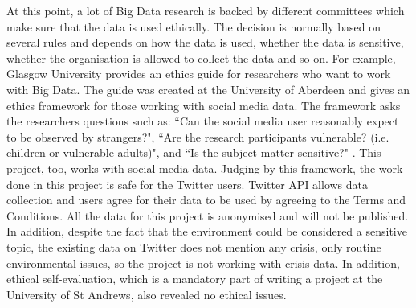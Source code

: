 At this point, a lot of Big Data research is backed by different committees which make sure that the data is used ethically. The decision is normally based on several rules and depends on how the data is used, whether the data is sensitive, whether the organisation is allowed to collect the data and so on. For example, Glasgow University provides an ethics guide for researchers who want to work with Big Data. The guide was created at the University of Aberdeen and gives an ethics framework for those working with social media data. The framework asks the researchers questions such as: ``Can the social media user reasonably expect to be observed by strangers?", ``Are the research participants vulnerable? (i.e. children or vulnerable adults)", and ``Is the subject matter sensitive?" \cite{ethicsguide}. 
This project, too, works with social media data. Judging by this framework, the work done in this project is safe for the Twitter users. Twitter API allows data collection and users agree for their data to be used by agreeing to the Terms and Conditions. All the data for this project is anonymised and will not be published. In addition, despite the fact that the environment could be considered a sensitive topic, the existing data on Twitter does not mention any crisis, only routine environmental issues, so the project is not working with crisis data. In addition, ethical self-evaluation, which is a mandatory part of writing a project at the University of St Andrews, also revealed no ethical issues. 


